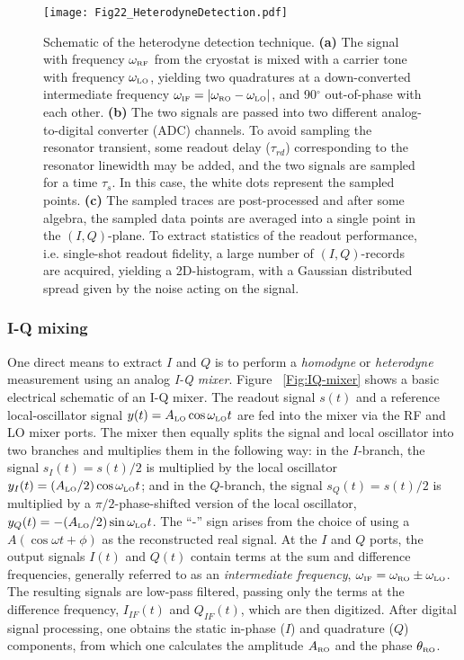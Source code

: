 \documentclass[aip,apr,twocolumn,showpacs,superscriptaddress,groupedaddress,nofootinbib,reprint]{revtex4-1}  %
\begin{document}
\begin{figure*}[htp!]
\begin{center}
\texttt{[image: Fig22\_HeterodyneDetection.pdf]}
\caption{Schematic of the heterodyne detection technique. \textbf{(a)} The signal with frequency $\omega_{\mbox{\tiny{RF}}}$ from the cryostat is mixed with a carrier tone with frequency $\omega_{\mbox{\tiny{LO}}}$, yielding two quadratures at a down-converted intermediate frequency $\omega_{\mbox{\tiny{IF}}} = |\omega_{\mbox{\tiny{RO}}} - \omega_{\mbox{\tiny{LO}}}|$, and 90$^{\circ}$ out-of-phase with each other. \textbf{(b)} The two signals are passed into two different analog-to-digital converter (ADC) channels. To avoid sampling the resonator transient, some readout delay ($\tau_{rd}$) corresponding to the resonator linewidth may be added, and the two signals are sampled for a time $\tau_s$. In this case, the white dots represent the sampled points. \textbf{(c)} The sampled traces are post-processed and after some algebra, the sampled data points are averaged into a single point in the $(I,Q)$-plane. To extract statistics of the readout performance, i.e. single-shot readout fidelity, a large number of $(I,Q)$-records are acquired, yielding a 2D-histogram, with a Gaussian distributed spread given by the noise acting on the signal.}
\label{Fig:HeterodyneMixing}
\end{center}
\end{figure*}

\subsubsection{I-Q mixing}
One direct means to extract $I$ and $Q$ is to perform a \textit{homodyne} or \textit{heterodyne} measurement using an analog \textit{I-Q mixer}. Figure ~\ref{Fig:IQ-mixer} shows a basic electrical schematic of an I-Q mixer. The readout signal $s(t)$ and a reference local-oscillator signal $y(t)= A_{\mbox{\tiny{LO}}} \cos \omega_{\mbox{\tiny{LO}}} t$ are fed into the mixer via the RF and LO mixer ports. The mixer then equally splits the signal and local oscillator into two branches and multiplies them in the following way: in the $I$-branch, the signal $s_I(t) = s(t)/2$ is multiplied by the local oscillator $y_I(t)= (A_{\mbox{\tiny{LO}}}/2) \cos \omega_{\mbox{\tiny{LO}}} t$; and in the $Q$-branch, the signal $s_Q(t) = s(t)/2$ is multiplied by a $\pi/2$-phase-shifted version of the local oscillator, $y_Q(t)= - (A_{\mbox{\tiny{LO}}}/2) \sin \omega_{\mbox{\tiny{LO}}} t$. The ``-'' sign arises from the choice of using a $A(\cos \omega t+\phi)$ as the reconstructed real signal. At the $I$ and $Q$ ports, the output signals $I(t)$ and $Q(t)$ contain terms at the sum and difference frequencies, generally referred to as an \textit{intermediate frequency}, $\omega_{\mbox{\tiny{IF}}} = \omega_{\mbox{\tiny{RO}}} \pm \omega_{\mbox{\tiny{LO}}}$. The resulting signals are low-pass filtered, passing only the terms at the difference frequency, $I_{IF}(t)$ and $Q_{IF}(t)$, which are then digitized. After digital signal processing, one obtains the static in-phase ($I$) and quadrature ($Q$) components, from which one calculates the amplitude $A_{\mbox{\tiny{RO}}}$ and the phase $\theta_{\mbox{\tiny{RO}}}$.
\end{document}
